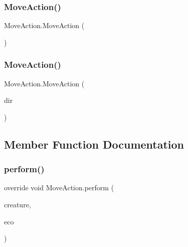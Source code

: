 \subsubsection{\texorpdfstring{Move\+Action()}{MoveAction()}\hspace{0.1cm}{\footnotesize\ttfamily [1/2]}}
{\footnotesize\ttfamily Move\+Action.\+Move\+Action (\begin{DoxyParamCaption}{ }\end{DoxyParamCaption})}

\mbox{\label{class_move_action_afff0c610e50f431d268386ed848640fd}} 
\subsubsection{\texorpdfstring{Move\+Action()}{MoveAction()}\hspace{0.1cm}{\footnotesize\ttfamily [2/2]}}
{\footnotesize\ttfamily Move\+Action.\+Move\+Action (\begin{DoxyParamCaption}\item[{\mbox{\hyperlink{_move_action_8cs_a9e4683fdca765fb08e2d0e5f7f57c162}{move\+Dir}}}]{dir }\end{DoxyParamCaption})}



\subsection{Member Function Documentation}
\mbox{\label{class_move_action_a259b4b4542e7f72df322e060d7737f71}} 
\subsubsection{\texorpdfstring{perform()}{perform()}}
{\footnotesize\ttfamily override void Move\+Action.\+perform (\begin{DoxyParamCaption}\item[{\mbox{\hyperlink{class_creature}{Creature}}}]{creature,  }\item[{\mbox{\hyperlink{class_ecosystem}{Ecosystem}}}]{eco }\end{DoxyParamCaption})\hspace{0.3cm}{\ttfamily [virtual]}}



